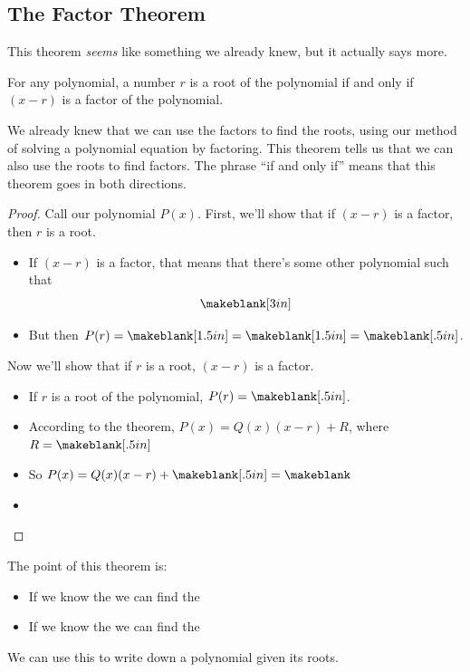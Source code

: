 \subsection{The Factor Theorem} 
This theorem \emph{seems} like something we already knew, but it actually says more.
\begin{theorem}
For any polynomial, a number $r$ is a root of the polynomial if and only if $(x-r)$ is a factor of the polynomial.
\end{theorem}
We already knew that we can use the factors to find the roots, using our method of solving a polynomial equation by factoring. This theorem tells us that we can also use the roots to find factors. The phrase ``if and only if'' means that this theorem goes in both directions.
\begin{proof}
Call our polynomial $P(x)$. First, we'll show that if $(x-r)$ is a factor, then $r$ is a root.
\begin{itemize}
\item If $(x-r)$ is a factor, that means that there's some other polynomial such that
\[
\makeblank[3in]
\]
\item But then $P(r)=\makeblank[1.5in]=\makeblank[1.5in]=\makeblank[.5in]$.
\end{itemize}
Now we'll show that if $r$ is a root, $(x-r)$ is a factor.
\begin{itemize}
\item If $r$ is a root of the polynomial, $P(r)=\makeblank[.5in]$.
\item According to the \makeblank[1.5in] theorem, $P(x)=Q(x)(x-r)+R$, where $R=\makeblank[.5in]$
\item So $P(x)=Q(x)(x-r)+\makeblank[.5in]=\makeblank$
\item \makeblank[5in]\qedhere
\end{itemize}
\end{proof}
The point of this theorem is:
\begin{itemize}
\item If we know the \makeblank[1.5in] we can find the \makeblank[1.5in]
\item If we know the \makeblank[1.5in] we can find the \makeblank[1.5in]
\end{itemize}
We can use this to write down a polynomial given its roots.